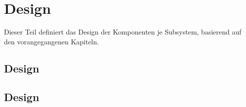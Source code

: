 \part{\LibName{} Design}
\label{sec:Design}

Dieser Teil definiert das Design der Komponenten je Subsystem, basierend auf den vorangegangenen Kapiteln.




\chapter{\SUBSTechBase{} Design}
\label{sec:SUBSUtilitydes}





\chapter{\SUBSLowLevel{} Design}
\label{sec:SUBSLowLeveldes}


%
%

%
%
